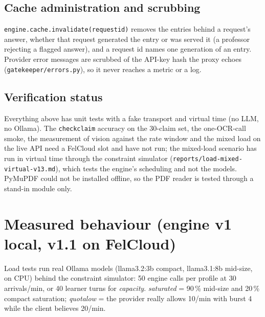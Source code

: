 \documentclass[11pt,a4paper]{article}
\renewcommand{\_}{\origus\allowbreak}
\begin{document}
\subsection{Cache administration and scrubbing}

\texttt{engine.cache.invalidate(request\_id)} removes the entries behind a request's answer, whether that request generated the
entry or was served it (a professor rejecting a flagged answer), and a request id names one generation of an entry. Provider error
messages are scrubbed of the API-key hash the proxy echoes (\texttt{gatekeeper/errors.py}), so it never reaches a metric or a log.

\subsection{Verification status}

Everything above has unit tests with a fake transport and virtual time (no LLM, no Ollama). The \texttt{check\_claim} accuracy on the
30-claim set, the one-OCR-call smoke, the measurement of vision against the rate window and the mixed load on the live API need a
FelCloud slot and have not run; the mixed-load scenario has run in virtual time through the constraint simulator
(\texttt{reports/load-mixed-virtual-v13.md}), which tests the engine's scheduling and not the models.
PyMuPDF could not be installed offline, so the PDF reader is tested through a stand-in module only.

\section{Measured behaviour (engine v1 local, v1.1 on FelCloud)}
\label{sec:numbers}

Load tests run real Ollama models (llama3.2:3b compact, llama3.1:8b mid-size, on CPU) behind the
constraint simulator: 50 engine calls per profile at 30 arrivals/min, or 40 learner turns for
\textit{capacity}. \textit{saturated} = 90\,\% mid-size and 20\,\% compact saturation; \textit{quota\_low} =
the provider really allows 10/min with burst 4 while the client believes 20/min.
\end{document}
